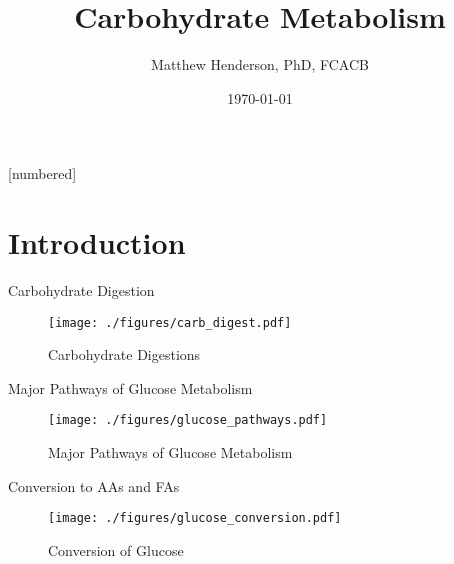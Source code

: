 \documentclass[presentation, smaller]{beamer}
\author{Matthew Henderson, PhD, FCACB}
\date{\today}
\title{Carbohydrate Metabolism}
\institute[NSO]{Newborn Screening Ontario | The University of Ottawa}
\begin{document}
\maketitle


\vspace{220pt}
\beamertemplatenavigationsymbolsempty
{}[numbered]

\section{Introduction}
\label{sec:orgaa60016}
\begin{frame}[label={sec:org59798de}]{Carbohydrate Digestion}
\begin{figure}[htbp]
\centering
\texttt{[image: ./figures/carb\_digest.pdf]}
\caption{\label{fig:org14151fb}
Carbohydrate Digestions}
\end{figure}
\end{frame}

\begin{frame}[label={sec:orgb93bb46}]{Major Pathways of Glucose Metabolism}
\begin{figure}[htbp]
\centering
\texttt{[image: ./figures/glucose\_pathways.pdf]}
\caption{\label{fig:orgba251b7}
Major Pathways of Glucose Metabolism}
\end{figure}
\end{frame}

\begin{frame}[label={sec:org82b8278}]{Conversion to AAs and FAs}
\begin{figure}[htbp]
\centering
\texttt{[image: ./figures/glucose\_conversion.pdf]}
\caption{\label{fig:orga7d1d64}
Conversion of Glucose}
\end{figure}
\end{frame}
\end{document}
